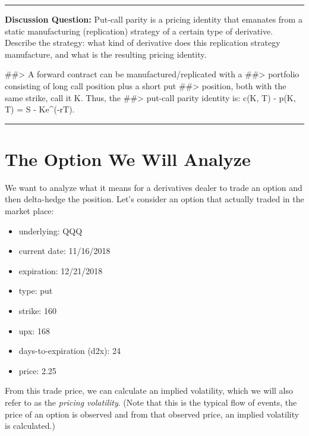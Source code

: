 \documentclass[
  letterpaper,
  DIV=11,
  numbers=noendperiod]{scrreprt}
\newenvironment{Shaded}{\begin{snugshade}}{\end{snugshade}}
\newcommand{\CommentTok}[1]{\textcolor[rgb]{0.37,0.37,0.37}{#1}}
\providecommand{\tightlist}{%
  \setlength{\itemsep}{0pt}\setlength{\parskip}{0pt}}\usepackage{longtable,booktabs,array}
\begin{document}
\begin{center}\rule{0.5\linewidth}{0.5pt}\end{center}

\textbf{Discussion Question:} Put-call parity is a pricing identity that
emanates from a static manufacturing (replication) strategy of a certain
type of derivative. Describe the strategy: what kind of derivative does
this replication strategy manufacture, and what is the resulting pricing
identity.

\begin{Shaded}
\begin{Highlighting}[]
\CommentTok{\#\#\textgreater{} A forward contract can be manufactured/replicated with a }
\CommentTok{\#\#\textgreater{} portfolio consisting of long call position plus a short put }
\CommentTok{\#\#\textgreater{} position, both with the same strike, call it K.  Thus, the }
\CommentTok{\#\#\textgreater{} put{-}call parity identity is: c(K, T) {-} p(K, T) = S {-} Ke\^{}({-}rT). }
\end{Highlighting}
\end{Shaded}

\begin{center}\rule{0.5\linewidth}{0.5pt}\end{center}

\hypertarget{the-option-we-will-analyze}{%
\section{The Option We Will Analyze}\label{the-option-we-will-analyze}}

We want to analyze what it means for a derivatives dealer to trade an
option and then delta-hedge the position. Let's consider an option that
actually traded in the market place:

\begin{itemize}
\tightlist
\item
  underlying: QQQ
\item
  current date: 11/16/2018
\item
  expiration: 12/21/2018
\item
  type: put
\item
  strike: 160
\item
  upx: 168
\item
  days-to-expiration (d2x): 24
\item
  price: 2.25
\end{itemize}

From this trade price, we can calculate an implied volatility, which we
will also refer to as the \emph{pricing volatility}. (Note that this is
the typical flow of events, the price of an option is observed and from
that observed price, an implied volatility is calculated.)
\end{document}
